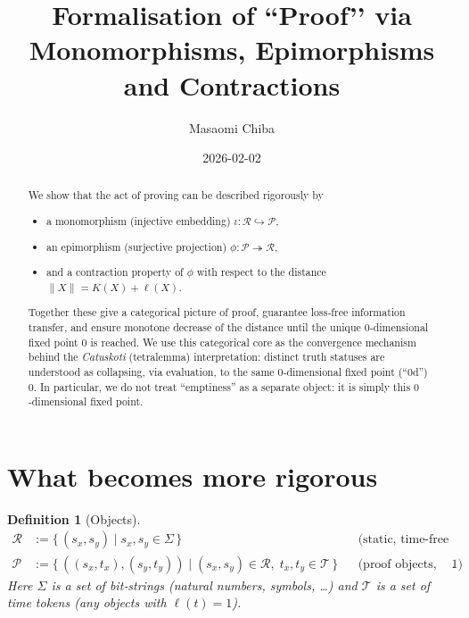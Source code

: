 \documentclass[12pt,a4paper]{article}
\newcommand{\dfix}{\mathfrak{0}}          %
\newcommand{\Rep}{\mathcal{R}}           %
\newcommand{\Prf}{\mathcal{P}}           %
\newcommand{\Tset}{\mathcal{T}}          %
\newtheorem{definition}{Definition}[section]
\begin{document}
\title{Formalisation of ``Proof’’ via Monomorphisms, Epimorphisms and
Contractions}
\author{Masaomi Chiba}
\date{2026-02-02}
\maketitle

\begin{abstract}
We show that the act of proving can be described rigorously by
\begin{itemize}[nosep]
  \item a monomorphism (injective embedding) $\iota\colon\Rep\hookrightarrow\Prf$,
  \item an epimorphism (surjective projection) $\phi\colon\Prf\twoheadrightarrow\Rep$,
  \item and a contraction property of $\phi$ with respect to the distance
        $\|X\|=K(X)+\ell(X)$.
\end{itemize}
Together these give a categorical picture of proof, guarantee loss‑free
information transfer, and ensure monotone decrease of the distance until the
unique $0$‑dimensional fixed point $\dfix$ is reached.
We use this categorical core as the convergence mechanism behind the
\emph{Catuskoti} (tetralemma) interpretation: distinct truth statuses are
understood as collapsing, via evaluation, to the same $0$‑dimensional fixed
point (``0d'') $\dfix$.
In particular, we do not treat ``emptiness'' as a separate object: it is
simply this $0$‑dimensional fixed point.
\end{abstract}

\section{What becomes more rigorous}

\begin{definition}[Objects]
$$
\begin{aligned}
\Rep &:= \{\, (s_x,s_y)\mid s_x,s_y\in\Sigma \,\}
      &&\text{(static, time‑free information)}\\[2mm]
\Prf &:= \{\, ((s_x,t_x),(s_y,t_y))
          \mid (s_x,s_y)\in\Rep,\;t_x,t_y\in\Tset \,\}
      &&\text{(proof objects, time‑axis of length $1$)} .
\end{aligned}
$$
Here $\Sigma$ is a set of bit‑strings (natural numbers, symbols, …) and
$\Tset$ is a set of \emph{time tokens} (any objects with $\ell(t)=1$).
\end{definition}
\end{document}

